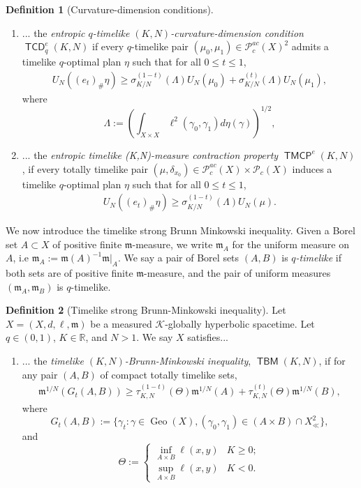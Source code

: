 \documentclass{article}
\newcommand{\R}{\mathbb{R}}
\newcommand{\m}{\mathfrak{m}}
\newcommand{\Pcal}{\mathcal{P}}
\DeclareMathOperator{\TCD}{\mathsf{TCD}}
\DeclareMathOperator{\TBM}{\mathsf{TBM}}
\DeclareMathOperator{\TMCP}{\mathsf{TMCP}}
\DeclareMathOperator{\Geo}{Geo}
\theoremstyle{definition}
\newtheorem{defn}{Definition}[section]
\begin{document}
{\begin{defn}[Curvature-dimension conditions]
\begin{enumerate}
\begin{align}
S_{N'}((e_t)_\#\eta)\leq -\int_{X\times X}\tau_{K,N'}^{(1-t)}(\ell(x,x_0)) \rho(x)^{-1/N'}d\mu(x),
\end{align}
where $d\mu=\rho d\m$. 
\item ... the {\it entropic $q$-timelike $(K,N)$-curvature-dimension condition} $\TCD^e_q(K,N)$ if every $q$-timelike pair $(\mu_0,\mu_1)\in \Pcal_c^{ac}(X)^2$ admits a timelike $q$-optimal plan $\eta$ such that for all $0\leq t\leq 1$,
\begin{align}
U_N((e_t)_\#\eta)\geq \sigma_{K/N}^{(1-t)}(\Lambda)U_N(\mu_0)+\sigma_{K/N}^{(t)}(\Lambda)U_N(\mu_1),
\end{align}
where 
\[\Lambda:= \left(\int_{X\times X} \ell^2(\gamma_0,\gamma_1)d\eta(\gamma)\right)^{1/2},\]

\item ...  the {\it entropic timelike (K,N)-measure contraction property} $\TMCP^e(K,N)$, if every totally timelike pair $(\mu,\delta_{x_0})\in \Pcal_c^{ac}(X)\times \Pcal_c(X)$ induces a timelike $q$-optimal plan $\eta$ such that for all $0\leq t\leq 1$, 
\begin{align}
U_N((e_t)_\#\eta)\geq\sigma_{K/N}^{(1-t)}(\Lambda) U_N(\mu).
\end{align}
\end{enumerate}
\end{defn}

We now introduce the timelike strong Brunn Minkowski inequality. Given a Borel set $A\subset X$ of positive finite $\m$-measure, we write $\m_A$ for the uniform measure on $A$, i.e $\m_A:= \m(A)^{-1}\m\vert_A$. We say a pair of Borel sets $(A,B)$ is {\it $q$-timelike} if both sets are of positive finite $\m$-measure, and the pair of uniform measures $(\m_A,\m_B)$ is $q$-timelike. 


\begin{defn}[Timelike strong Brunn-Minkowski inequality]
Let $X=(X,d,\ell, \m)$ be a measured $\mathcal{K}$-globally hyperbolic spacetime. Let $q\in(0,1)$, $K\in \R$, and $N>1$. 
We say $X$ satisfies... 

\begin{enumerate}
\item ... the {\it timelike $(K,N)$-Brunn-Minkowski inequality}, $\TBM(K,N)$, if for any pair $(A,B)$ of compact totally timelike sets,  
\begin{align}
\m^{1/N}(G_t(A,B))\geq \tau^{(1-t)}_{K,N}(\Theta)\m^{1/N}(A)+\tau^{(t)}_{K,N}(\Theta)\m^{1/N}(B),
\end{align}
where 
\[G_t(A,B):= \{\gamma_t: \gamma\in \Geo(X), (\gamma_0,\gamma_1)\in (A\times B)\cap X_\ll^2\},\]
and 
\[\Theta:= \begin{cases}
\inf_{A\times B} \ell(x,y) & K\geq 0; \\
\sup_{A\times B} \ell(x,y) & K<0.
\end{cases}\]





\end{enumerate}
\end{defn}}
\end{document}
